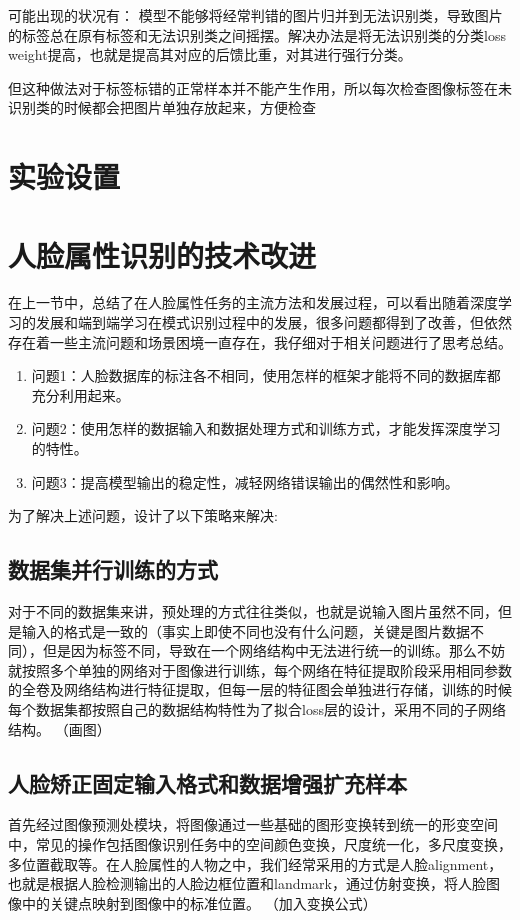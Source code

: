 可能出现的状况有：
模型不能够将经常判错的图片归并到无法识别类，导致图片的标签总在原有标签和无法识别类之间摇摆。解决办法是将无法识别类的分类loss weight提高，也就是提高其对应的后馈比重，对其进行强行分类。

但这种做法对于标签标错的正常样本并不能产生作用，所以每次检查图像标签在未识别类的时候都会把图片单独存放起来，方便检查

\section{实验设置}
\section{人脸属性识别的技术改进}
在上一节中，总结了在人脸属性任务的主流方法和发展过程，可以看出随着深度学习的发展和端到端学习在模式识别过程中的发展，很多问题都得到了改善，但依然存在着一些主流问题和场景困境一直存在，我仔细对于相关问题进行了思考总结。
\begin{enumerate}
\item 问题1：人脸数据库的标注各不相同，使用怎样的框架才能将不同的数据库都充分利用起来。
\item 问题2：使用怎样的数据输入和数据处理方式和训练方式，才能发挥深度学习的特性。
\item 问题3：提高模型输出的稳定性，减轻网络错误输出的偶然性和影响。
\end{enumerate}
为了解决上述问题，设计了以下策略来解决:
\subsection{数据集并行训练的方式}
对于不同的数据集来讲，预处理的方式往往类似，也就是说输入图片虽然不同，但是输入的格式是一致的（事实上即使不同也没有什么问题，关键是图片数据不同），但是因为标签不同，导致在一个网络结构中无法进行统一的训练。那么不妨就按照多个单独的网络对于图像进行训练，每个网络在特征提取阶段采用相同参数的全卷及网络结构进行特征提取，但每一层的特征图会单独进行存储，训练的时候每个数据集都按照自己的数据结构特性为了拟合loss层的设计，采用不同的子网络结构。	
（画图）

\subsection{人脸矫正固定输入格式和数据增强扩充样本}
首先经过图像预测处模块，将图像通过一些基础的图形变换转到统一的形变空间中，常见的操作包括图像识别任务中的空间颜色变换，尺度统一化，多尺度变换，多位置截取等。在人脸属性的人物之中，我们经常采用的方式是人脸alignment，也就是根据人脸检测输出的人脸边框位置和landmark，通过仿射变换，将人脸图像中的关键点映射到图像中的标准位置。
（加入变换公式）





